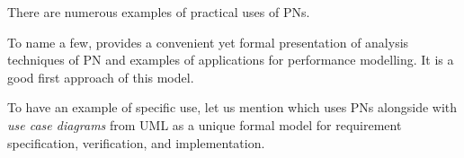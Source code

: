 There are numerous examples of practical uses of \acp{PN}.

To name a few,
\cite{Murata89} provides a convenient yet formal presentation of analysis techniques of \ac{PN} and examples of applications for performance modelling.
It is a good first approach of this model.

To have an example of specific use, let us mention
\cite{koci2016modeling} which uses \acp{PN} alongside with \emph{use case diagrams} from \ac{UML} as a unique formal model for requirement specification, verification, and implementation.
